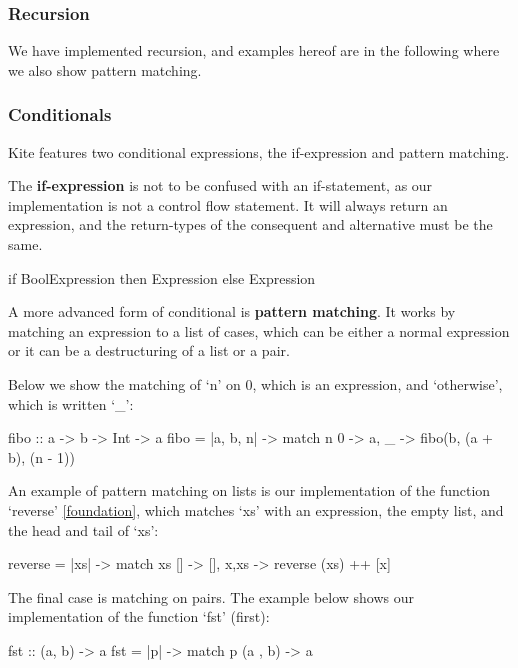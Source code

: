 \subsubsection{Recursion}

We have implemented recursion, and examples hereof are in the following where we also show pattern matching.

\subsubsection{Conditionals}

Kite features two conditional expressions, the if-expression and pattern matching.



The \textbf{if-expression} is not to be confused with an if-statement, as our implementation is not a control flow statement. It will always return an expression, and the return-types of the consequent and alternative must be the same.


\begin{kite}
if BoolExpression then Expression else Expression
\end{kite}

A more advanced form of conditional is \textbf{pattern matching}. It works by matching an expression to a list of cases, which can be either a normal expression or it can be a destructuring of a list or a pair.

Below we show the matching of `n' on 0, which is an expression, and `otherwise', which is written `\_':
\begin{kite}
fibo :: a -> b -> Int -> a
fibo = |a, b, n| -> {
    match n {
    0 -> a,
    _ -> fibo(b, (a + b), (n - 1))
    }
}
\end{kite}

An example of pattern matching on lists is our implementation of the function `reverse' \ref{foundation}, which matches `xs' with an expression, the empty list, and the head and tail of `xs':

\begin{kite}
reverse = |xs| -> {
  match xs {
    []    -> [],
    x,xs  -> reverse (xs) ++ [x]
  }
}

\end{kite}

The final case is matching on pairs. The example below shows our implementation of the function `fst' (first):
\begin{kite}
fst :: (a, b) -> a
fst = |p| -> {
  match p {
    (a , b) -> a
  }
}
\end{kite}

